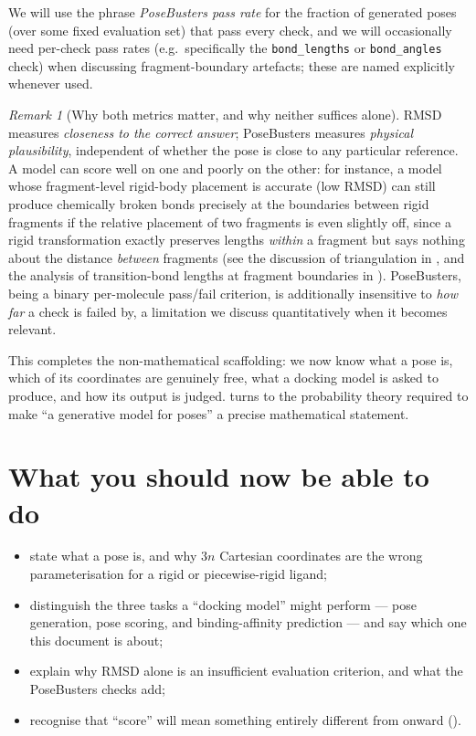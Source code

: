 \documentclass[11pt,a4paper]{report}
\theoremstyle{definition}
\theoremstyle{remark}
\newtheorem{remark}[remark]{Remark}
\begin{document}
We will use the phrase \emph{PoseBusters pass rate} for the fraction of
generated poses (over some fixed evaluation set) that pass every check, and
we will occasionally need per-check pass rates (e.g.\ specifically the
\texttt{bond\_lengths} or \texttt{bond\_angles} check) when discussing
fragment-boundary artefacts; these are named explicitly whenever used.

\begin{remark}[Why both metrics matter, and why neither suffices alone]
RMSD measures \emph{closeness to the correct answer}; PoseBusters measures
\emph{physical plausibility}, independent of whether the pose is close to
any particular reference. A model can score well on one and poorly on the
other: for instance, a model whose fragment-level rigid-body placement is
accurate (low RMSD) can still produce chemically broken bonds precisely at
the boundaries between rigid fragments if the relative placement of two
fragments is even slightly off, since a rigid transformation exactly
preserves lengths \emph{within} a fragment but says nothing about the
distance \emph{between} fragments (see the discussion of triangulation in
, and the analysis of transition-bond lengths at
fragment boundaries in ). PoseBusters, being a binary
per-molecule pass/fail criterion, is additionally insensitive to
\emph{how far} a check is failed by, a limitation we discuss quantitatively
when it becomes relevant.
\end{remark}

This completes the non-mathematical scaffolding: we now know what a pose
is, which of its coordinates are genuinely free, what a docking model is
asked to produce, and how its output is judged. 
turns to the probability theory required to make ``a generative model for
poses'' a precise mathematical statement.


\section{What you should now be able to do}

\begin{itemize}[nosep]
\item state what a pose is, and why $3n$ Cartesian coordinates are the wrong parameterisation for a rigid or piecewise-rigid ligand;
\item distinguish the three tasks a ``docking model'' might perform --- pose generation, pose scoring, and binding-affinity prediction --- and say which one this document is about;
\item explain why RMSD alone is an insufficient evaluation criterion, and what the PoseBusters checks add;
\item recognise that ``score'' will mean something entirely different from  onward ().
\end{itemize}
\end{document}
